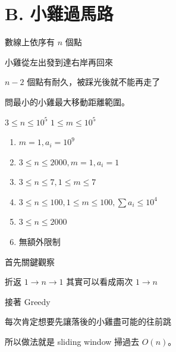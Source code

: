 \section{B. 小雞過馬路}

\begin{frame}{}
    數線上依序有 $n$ 個點

    小雞從左出發到達右岸再回來

    $n-2$ 個點有耐久，被踩光後就不能再走了

    問最小的小雞最大移動距離範圍。

    $3 \le n \le 10^5$
    $1 \le m \le 10^5$
\end{frame}

\begin{frame}{}
    \begin{enumerate}
        \item{$m = 1, a_i = 10^9$}
        \item{$3 \le n \le 2000, m = 1, a_i = 1$}
        \item{$3 \le n \le 7, 1 \le m \le 7$}
        \item{$3 \le n \le 100, 1 \le m \le 100, \sum a_i \le 10^4$}
        \item{$3 \le n \le 2000$}
        \item{無額外限制}
    \end{enumerate}
\end{frame}

\begin{frame}{}
    首先關鍵觀察

    \begin{property}
        折返 $1 \to n \to 1$ 其實可以看成兩次 $1 \to n$
    \end{property}

    接著 Greedy

    \begin{property}
        每次肯定想要先讓落後的小雞盡可能的往前跳
    \end{property}

    所以做法就是 sliding window 掃過去 $O(n)$。
\end{frame}
